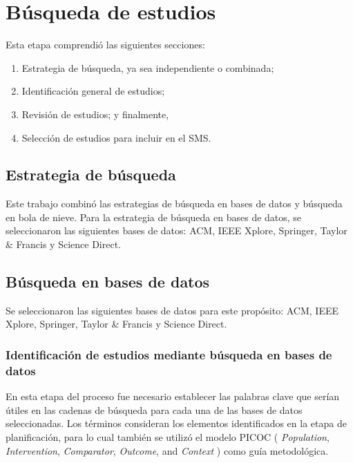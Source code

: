 \section{Búsqueda de estudios}

Esta etapa comprendió las siguientes secciones:
\begin{enumerate}
	\item Estrategia de búsqueda, ya sea independiente o combinada;
	\item Identificación general de estudios;
	\item Revisión de estudios; y finalmente,
	\item Selección de estudios para incluir en el SMS.\@
\end{enumerate}

\subsection{Estrategia de búsqueda}

Este trabajo combinó las estrategias de búsqueda en bases de datos y búsqueda en bola de nieve.
Para la estrategia de búsqueda en bases de datos, se seleccionaron las siguientes bases de datos: ACM, IEEE Xplore, Springer, Taylor \& Francis y Science Direct.

\subsection{Búsqueda en bases de datos}\label{subsec:busquedaBasesDatos}
Se seleccionaron las siguientes bases de datos para este propósito: ACM, IEEE Xplore, Springer, Taylor \& Francis y Science Direct.

\subsubsection{Identificación de estudios mediante búsqueda en bases de datos}\label{subsubsec:identificacionEstudios}
En esta etapa del proceso fue necesario establecer las palabras clave que serían útiles en las cadenas de búsqueda para cada una de las bases de datos seleccionadas.
Los términos consideran los elementos identificados en la etapa de planificación, para lo cual también se utilizó el modelo PICOC ( \textit{Population}, \textit{Intervention}, \textit{Comparator}, \textit{Outcome}, and \textit{Context} ) como guía metodológica.

